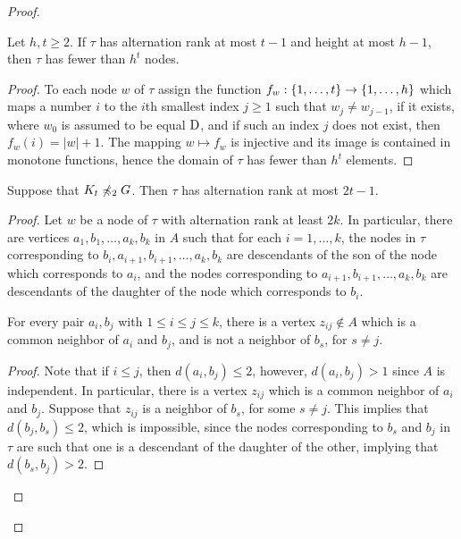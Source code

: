 \begin{proof}
\begin{lemma}\label{lem:number-of-nodes}
Let $h,t\ge 2$.	If $\tau$ has alternation rank at most $t-1$ and height at most $h-1$, then $\tau$ has fewer than $h^{t}$
	nodes.
\end{lemma}
\begin{proof}		
	To each node $w$ of $\tau$ assign 
	the function $f_w:\{1,\ldots,t\}\to\{1,\ldots,h\}$ which
	maps a number $i$ to the $i$th smallest index $j\ge 1$
	such that $w_j\neq w_{j-1}$, if it exists, 
	where $w_0$ is assumed to be equal $\mathrm{D}$,
	and if such an index $j$ does not exist, then $f_w(i)=|w|+1$.
		The mapping $w\mapsto f_w$ is injective
and its image is contained in monotone functions, hence the domain of $\tau$ 
		has fewer than $h^{t}$ elements.
\end{proof}

\begin{lemma}\label{thm:alternation-rank-type-tree}
Suppose that  $K_t\not\preccurlyeq_{2} G$.
Then $\tau$ has alternation rank at most $2t-1$.
\end{lemma}
\begin{proof}
	Let $w$ be a node of $\tau$ with alternation rank at least $2k$.  
	In particular, there are vertices $a_1,b_1,\ldots,a_k,b_k$ in $A$
	such that for each $i=1,\ldots,k$, 
	the nodes in $\tau$ corresponding to $b_i,a_{i+1},b_{i+1},\ldots,a_k,b_k$ are  descendants of the son of the node which corresponds to $a_i$,
	and the nodes corresponding to $a_{i+1},b_{i+1},\ldots,a_k,b_k$
	are descendants of the daughter of the node which corresponds to $b_i$.
	
	\begin{claim}\label{claim:minor}
		For every pair $a_i,b_j$ with $1\le i\le j\le k$, there is a vertex $z_{ij}\not\in A$		which is a common neighbor of $a_i$ and $b_j$,
		and is not a neighbor of $b_s$, for $s\neq j$.
	\end{claim}
	\begin{proof}
		Note that if $i\le j$, then $d(a_i,b_j)\le 2$, however, $d(a_i,b_j)>1$ since $A$
		is independent. In particular, there is a vertex $z_{ij}$ which is a common neighbor of $a_i$ and $b_j$. 
		Suppose that $z_{ij}$ is a neighbor of $b_s$, for some $s\neq j$. This implies that $d(b_j,b_s)\le 2$, which is impossible, 
since
		 the nodes corresponding to $b_s$ and $b_j$ in $\tau$ are such that one is a descendant of the daughter of the other, implying that $d(b_s,b_j)>2$.
	\end{proof}
  



\end{proof}
\end{proof}
